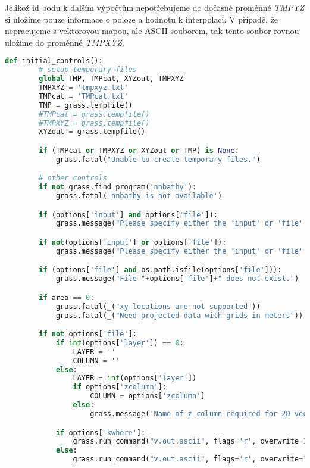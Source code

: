 \documentclass[12pt,a4paper]{article}
\begin{document}
Jelikož id bodu k dalším výpočtům nepotřebujeme do dočasné proměnné \textit{TMPYZ} si uložíme pouze informace o poloze a hodnotu k interpolaci. V případě, že nepracujeme s vektorovou mapou, ale ASCII souborem, tak tento soubor rovnou uložíme do proměnné \textit{TMPXYZ}.

\begin{lstlisting}[language=python, caption={python version}]
    def initial_controls():
        # setup temporary files
        global TMP, TMPcat, XYZout, TMPXYZ
        TMPXYZ = 'tmpxyz.txt'
        TMPcat = 'TMPcat.txt'
        TMP = grass.tempfile()
        #TMPcat = grass.tempfile()
        #TMPXYZ = grass.tempfile()
        XYZout = grass.tempfile()

        if (TMPcat or TMPXYZ or XYZout or TMP) is None:
            grass.fatal("Unable to create temporary files.")

        # other controls
        if not grass.find_program('nnbathy'):
            grass.fatal('nnbathy is not available')

        if (options['input'] and options['file']):
            grass.message("Please specify either the 'input' or 'file' option, not both.")

        if not(options['input'] or options['file']):
            grass.message("Please specify either the 'input' or 'file' option.")

        if (options['file'] and os.path.isfile(options['file'])):
            grass.message("File "+options['file']+" does not exist.")

        if area == 0:
            grass.fatal(_("xy-locations are not supported"))
            grass.fatal(_("Need projected data with grids in meters"))

        if not options['file']:
            if int(options['layer']) == 0:
                LAYER = ''
                COLUMN = ''
            else:
                LAYER = int(options['layer'])
                if options['zcolumn']:
                    COLUMN = options['zcolumn']
                else:
                    grass.message('Name of z column required for 2D vector maps.')

            if options['kwhere']:
                grass.run_command("v.out.ascii", flags='r', overwrite=1, input=options['input'], output=TMPcat, format="point", separator="space", precision=15, where=options['kwhere'], layer=LAYER, columns=COLUMN)
            else:
                grass.run_command("v.out.ascii", flags='r', overwrite=1, input=options['input'], output=TMPcat, format="point", separator="space", precision=15, layer=LAYER, columns=COLUMN)


\end{lstlisting}
\end{document}
